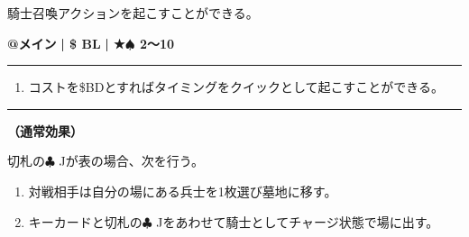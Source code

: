 \documentclass[twocolumn,a5paper,papersize,10pt]{jarticle}
\begin{document}
騎士召喚アクションを起こすことができる。

\begin{tcolorbox}[title={\small\bf【Action】騎士召喚}{\scriptsize （召喚）}]

{\scriptsize\bf @メイン }
  {\scriptsize\bf | \$ BL }
  {\scriptsize\bf | ★{\normalsize $\spadesuit$} 2〜10}

\vspace{1mm} %
\hrule height 0.1mm depth 0mm width 62mm %
\vspace{1mm} %


\vspace{-1zh}%
\begin{enumerate}
\renewcommand{\labelenumi}{※}
\setlength{\leftskip}{-0.3cm}
\setlength{\itemsep}{0pt} %
\setlength{\parskip}{0pt} %

\item コストを\$BDとすればタイミングをクイックとして起こすことができる。

\vspace{-3mm}%
\end{enumerate}
\vspace{-2mm} %
\vspace{1zh}%
\vspace{1mm} %
\hrule height 0.1mm depth 0mm width 62mm %
\vspace{1mm} %

{\bf（通常効果）}

切札の{\normalsize $\clubsuit$} Jが表の場合、次を行う。


\vspace{-1zh}%
\begin{enumerate}
\setlength{\leftskip}{-0.3cm}
\setlength{\parskip}{0pt} %

\item 対戦相手は自分の場にある兵士を1枚選び墓地に移す。

\item キーカードと切札の{\normalsize $\clubsuit$} Jをあわせて騎士としてチャージ状態で場に出す。
\vspace{-1zh}%
\end{enumerate}

\vspace{1mm} %
\end{tcolorbox}
\end{document}
